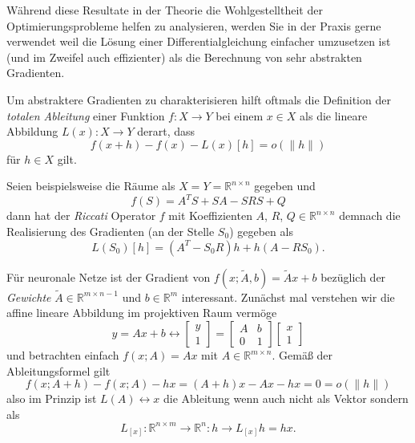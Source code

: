 \documentclass[
]{book}
\theoremstyle{definition}
\theoremstyle{definition}
\theoremstyle{definition}
\theoremstyle{definition}
\theoremstyle{remark}
\begin{document}
Während diese Resultate in der Theorie die Wohlgestelltheit der
Optimierungsprobleme helfen zu analysieren, werden Sie in der Praxis gerne
verwendet weil die Lösung einer Differentialgleichung einfacher umzusetzen
ist (und im Zweifel auch effizienter) als die Berechnung von sehr abstrakten
Gradienten.

Um abstraktere Gradienten zu charakterisieren hilft oftmals die Definition der
\emph{totalen Ableitung} einer Funktion \(f\colon X\to Y\) bei einem \(x\in X\) als die lineare Abbildung \(L(x)\colon X\to Y\) derart, dass
\begin{equation*}
f(x+h) - f(x) - L(x)[h] = o(\| h\|)
\end{equation*}
für \(h\in X\) gilt.

Seien beispielsweise die Räume als \(X=Y=\mathbb R^{n\times n}\) gegeben und
\begin{equation}
f(S) = A^TS + SA -SRS + Q
\label{eq:eqn-ric-operator}
\end{equation}
dann hat der \emph{Riccati} Operator \(f\) mit Koeffizienten \(A\), \(R\), \(Q \in \mathbb R^{n\times n}\)
demnach die Realisierung des Gradienten (an der Stelle \(S_0\)) gegeben als
\begin{equation*}
L(S_0)[h] = (A^T-S_0R)h + h(A-RS_0).
\end{equation*}

Für neuronale Netze ist der Gradient von \(f(x; \tilde A, b)=\tilde Ax+b\) bezüglich der
\emph{Gewichte} \(\tilde A\in \mathbb R^{m\times n-1}\) und \(b\in \mathbb R^{m}\) interessant.
Zunächst mal verstehen wir die affine lineare Abbildung im
projektiven Raum vermöge
\begin{equation*}
y = Ax + b \longleftrightarrow \begin{bmatrix} y \\ 1 \end{bmatrix} = \begin{bmatrix}A & b \\ 0 & 1 \end{bmatrix}\begin{bmatrix} x \\ 1
\end{bmatrix}
\end{equation*}
und betrachten einfach \(f(x; A)=Ax\) mit \(A\in \mathbb R^{m\times n}\). Gemäß der Ableitungsformel gilt
\begin{equation*}
f(x;A+h) - f(x;A) - hx = (A+h)x - Ax - hx = 0 = o(\|h\|)
\end{equation*}
also im Prinzip ist \(L(A)\leftrightarrow x\) die Ableitung wenn auch nicht als Vektor sondern als
\begin{equation*}
L_{[x]}\colon \mathbb R^{n\times m} \to \mathbb R^{n}\colon h\to L_{[x]} h = hx.
\end{equation*}
\end{document}
